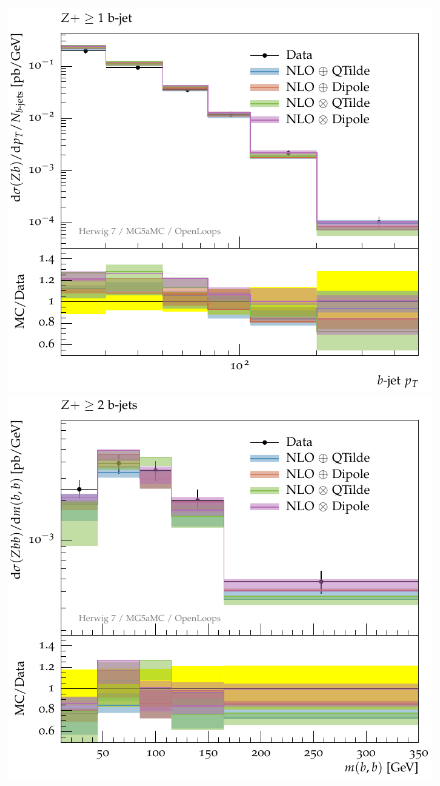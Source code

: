 \documentclass[11pt]{cernrep}
\begin{document}
\begin{figure}[htbp]
\begin{center}
   \includegraphics[scale=0.65]{figs/zbb/herwigzb/atlas-d03-x01-y01.pdf} 
   \includegraphics[scale=0.65]{figs/zbb/herwigzb/atlas-d23-x01-y01.pdf} \\

\end{center}
\end{figure}
\end{document}
